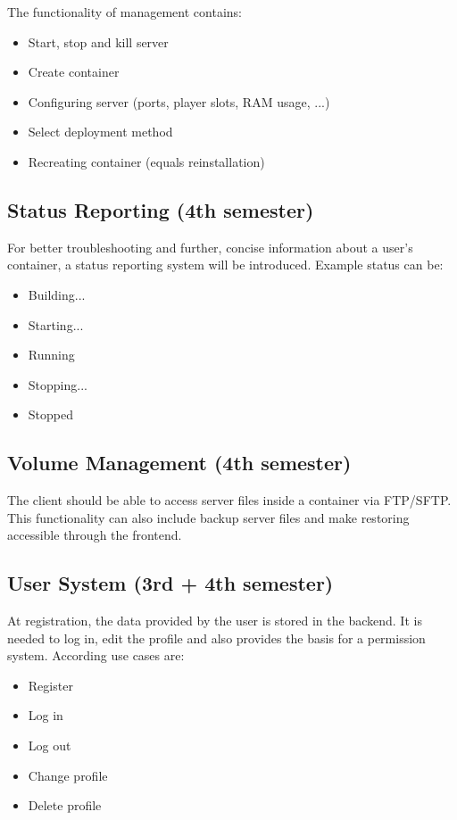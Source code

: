 \documentclass[a4paper,12pt,chapterprefix=false,bibliography=totoc,listof=totoc,]{scrreprt}
\begin{document}
 
The functionality of management contains:
\begin{itemize}
	\item Start, stop and kill server
	\item Create container
	\item Configuring server (ports, player slots, RAM usage, ...)
	\item Select deployment method
	\item Recreating container (equals reinstallation)
\end{itemize}

\subsection{Status Reporting (4th semester)}
For better troubleshooting and further, concise information about a user's container, a status reporting system will be introduced. Example status can be:
\begin{itemize}
	\item Building...
	\item Starting...
	\item Running
	\item Stopping...
	\item Stopped
\end{itemize}

\subsection{Volume Management (4th semester)}
The client should be able to access server files inside a container via FTP/SFTP. This functionality can also include backup server files and make restoring accessible through the frontend.

\subsection{User System (3rd + 4th semester)}
At registration, the data provided by the user is stored in the backend. It is needed to log in, edit the profile and also provides the basis for a permission system. According use cases are:

\begin{itemize}
	\item Register
	\item Log in
	\item Log out
	\item Change profile
	\item Delete profile
\end{itemize}
\end{document}
